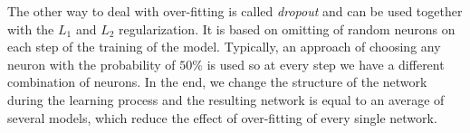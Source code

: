 The other way to deal with over-fitting is called \textit{dropout} and can be used together with the $L_{1}$ and $L_{2}$ regularization.
It is based on omitting of random neurons on each step of the training of the model.
Typically, an approach of choosing any neuron with the probability of $50\%$ is used so at every step we have a different combination of neurons.
In the end, we change the structure of the network during the learning process and the resulting network is equal to an average of several models, which reduce the effect of over-fitting of every single network.



